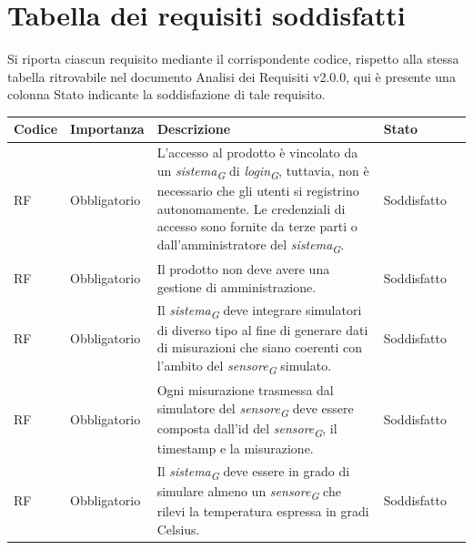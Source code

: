 \section{Tabella dei requisiti soddisfatti}

Si riporta ciascun requisito mediante il corrispondente codice,
rispetto alla stessa tabella ritrovabile nel documento Analisi dei Requisiti v2.0.0, qui è presente
una colonna Stato indicante la soddisfazione di tale requisito.

\setcounter{rowcounter}{0}

\begin{longtable}{|C{1.5cm}|C{2cm}|L{5cm}|C{2cm}|C{1.5cm}|}
    \hline
    \textbf{Codice} & \textbf{Importanza} & \textbf{Descrizione} & \textbf{Stato} \\
    
    \hline
    RF & Obbligatorio &
    L'accesso al prodotto è vincolato da un \textit{sistema}\textsubscript{\textit{G}} di \textit{login}\textsubscript{\textit{G}}, tuttavia, non è necessario che gli utenti si registrino autonomamente. Le credenziali di accesso sono fornite da terze parti o dall'amministratore del \textit{sistema}\textsubscript{\textit{G}}.& Soddisfatto &\\
    
    \hline
     RF & Obbligatorio & Il prodotto non deve avere una gestione di amministrazione.& Soddisfatto \\
    
    \hline
     RF & Obbligatorio & Il \textit{sistema}\textsubscript{\textit{G}} deve integrare simulatori di diverso tipo al fine di generare dati di misurazioni che siano coerenti con l'ambito del \textit{sensore}\textsubscript{\textit{G}} simulato.& Soddisfatto \\
    
    \hline
     RF & Obbligatorio & Ogni misurazione trasmessa dal simulatore del \textit{sensore}\textsubscript{\textit{G}} deve essere composta dall'id del \textit{sensore}\textsubscript{\textit{G}}, il timestamp e la misurazione.& Soddisfatto\\
    
    \hline
     RF & Obbligatorio &  Il \textit{sistema}\textsubscript{\textit{G}} deve essere in grado di simulare almeno un \textit{sensore}\textsubscript{\textit{G}} che rilevi la temperatura espressa in gradi Celsius.& Soddisfatto \\
    

\end{longtable}
